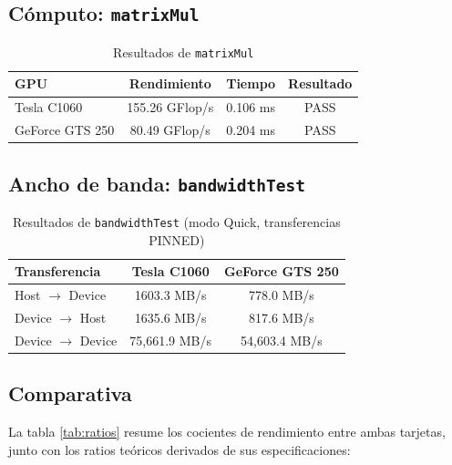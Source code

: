 \subsection{Cómputo: \texttt{matrixMul}}

\begin{table}[htbp]
\centering
\begin{tabular}{|l|c|c|c|}
\hline
\textbf{GPU} & \textbf{Rendimiento} & \textbf{Tiempo} & \textbf{Resultado} \\
\hline
Tesla C1060 & 155.26 GFlop/s & 0.106 ms & PASS \\
\hline
GeForce GTS 250 & 80.49 GFlop/s & 0.204 ms & PASS \\
\hline
\end{tabular}
\caption{Resultados de \texttt{matrixMul}}
\label{tab:matrixmul}
\end{table}

\subsection{Ancho de banda: \texttt{bandwidthTest}}

\begin{table}[htbp]
\centering
\begin{tabular}{|l|c|c|}
\hline
\textbf{Transferencia} & \textbf{Tesla C1060} & \textbf{GeForce GTS 250} \\
\hline
Host $\rightarrow$ Device & 1603.3 MB/s & 778.0 MB/s \\
\hline
Device $\rightarrow$ Host & 1635.6 MB/s & 817.6 MB/s \\
\hline
Device $\rightarrow$ Device & 75,661.9 MB/s & 54,603.4 MB/s \\
\hline
\end{tabular}
\caption{Resultados de \texttt{bandwidthTest} (modo Quick, transferencias PINNED)}
\label{tab:bandwidth}
\end{table}

\subsection{Comparativa}

La tabla \ref{tab:ratios} resume los cocientes de rendimiento entre ambas tarjetas, junto con los ratios teóricos derivados de sus especificaciones:

